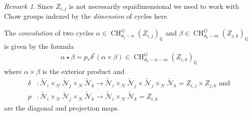 \documentclass{amsart}
\theoremstyle{plain}
\theoremstyle{TheoremNum}
\theoremstyle{definition}
\theoremstyle{remark}
\newtheorem{remark}[theorem]{Remark}
\numberwithin{equation}{section}
\newcommand{\Q}{\mathbb{Q}}
\newcommand{\M}{\widetilde{\mathcal{N}}}
\newcommand{\N}{\mathcal{N}}
\newcommand{\Chow}{\operatorname{CH}}
\begin{document}
\begin{remark}
Since $Z_{i,j}$ is not necessarily equidimensional we need to work with Chow groups indexed by the \emph{dimension} of cycles here.
\end{remark}
The \emph{convolution} of two cycles
$\alpha\in \Chow^G_{d_j-n}(Z_{i,j})_\Q$ and $\beta\in \Chow^G_{d_k-m}(Z_{j,k})_\Q$ is given by the formula
\begin{align}
    \alpha\star\beta=p_*\delta^!(\alpha\times\beta)\in \Chow^G_{d_k-n-m}(Z_{i,k})_\Q \label{eq:convolution}
\end{align}
where $\alpha\times\beta$ is the exterior product and 
\begin{align*}
    \delta&: \M_i\times_\N\M_j\times_\N\M_k\to \M_i\times_\N\M_j\times\M_j\times_\N\M_k=Z_{i,j}\times Z_{j,k}\text{ and}\\
    p&: \M_i\times_\N\M_j\times_\N\M_k\to \M_i\times_\N\M_k = Z_{i,k}
\end{align*}
are the diagonal and projection maps.
\end{document}
